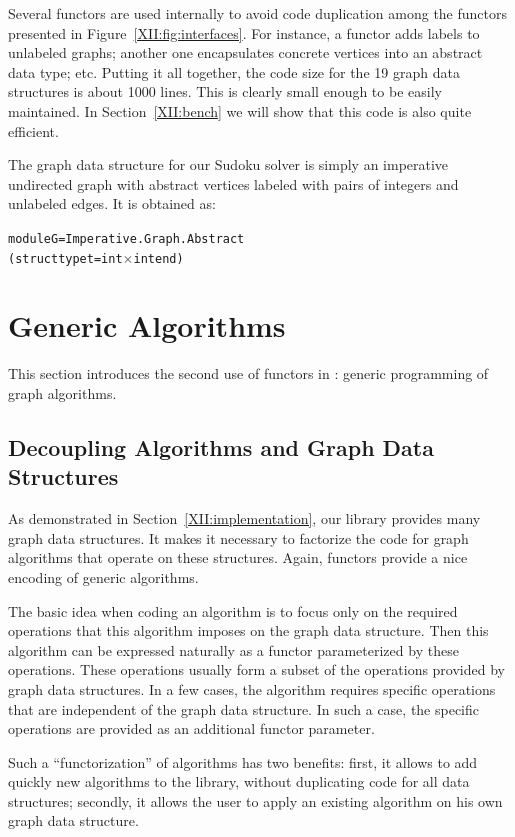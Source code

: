 Several functors are used internally to avoid code duplication among the
functors presented in Figure~\ref{XII:fig:interfaces}. For instance, a
functor adds labels to 
unlabeled graphs; another one encapsulates concrete vertices into an
abstract data type; etc.  Putting it all together, the code size for
the 19 graph data structures is about 1000 lines. This is clearly
small enough to be easily maintained. In Section~\ref{XII:bench} we will
show that this code is also quite efficient.

The graph data structure for our Sudoku solver is simply an imperative
undirected graph with abstract vertices labeled with pairs of integers
and unlabeled edges. It is obtained as:
\begin{alltt}
module G = Imperative.Graph.Abstract
             (struct type t = int \ensuremath{\times} int end) 
\end{alltt}

\section{Generic Algorithms}\label{XII:algos}

This section introduces the second use of functors in \ocamlgraph:
generic programming of graph algorithms.

\subsection{Decoupling Algorithms and Graph Data Structures}

As demonstrated in Section~\ref{XII:implementation}, our library provides
many graph data structures. It makes it necessary to factorize the
code for graph algorithms that operate on these structures. Again,
functors provide a nice encoding of generic algorithms.

The basic idea when coding an algorithm is to focus only on the
required operations that this algorithm imposes on the graph data
structure. Then this algorithm can be expressed naturally as a functor
parameterized by these operations. These operations usually form a
subset of the operations provided by \ocamlgraph graph data
structures. In a few cases, the algorithm requires specific operations
that are independent of the graph data structure. In such a case, the
specific operations are provided as an additional functor parameter.

Such a ``functorization'' of algorithms has two benefits: first, it
allows to add quickly new algorithms to the library, without
duplicating code for all data structures; secondly, it allows the user to
apply an existing algorithm on his own graph data structure.

